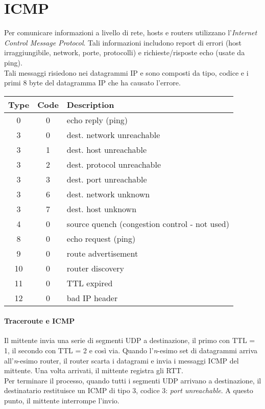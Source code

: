 \section{ICMP}
Per comunicare informazioni a livello di rete, hosts e routers utilizzano l'\textit{Internet Control Message Protocol}. Tali informazioni includono report di errori (host irraggiungibile, network, porte, protocolli) e richieste/risposte echo (usate da ping).\\
Tali messaggi risiedono nei datagrammi IP e sono composti da tipo, codice e i primi 8 byte del datagramma IP che ha causato l'errore.
\begin{center}
	\begin{tabular}{|c|c|p{5cm}|}
		\hline
		Type & Code & Description\\
		\hline
		0 & 0 & echo reply (ping)\\
		\hline
		3 & 0 & dest. network unreachable\\
		\hline
		3 & 1 & dest. host unreachable\\
		\hline
		3 & 2 & dest. protocol unreachable\\ 
		\hline
		3 & 3 & dest. port unreachable\\
		\hline
		3 & 6 & dest. network unknown\\
		\hline
		3 & 7 & dest. host unknown\\
		\hline
		4 & 0 & source quench (congestion control - not used)\\
		\hline
		8 & 0 & echo request (ping)\\
		\hline
		9 & 0 & route advertisement\\
		\hline
		10& 0 & router discovery\\
		\hline
		11& 0 & TTL expired\\
		\hline
		12& 0 & bad IP header\\
		\hline
	\end{tabular}
\end{center}

\paragraph{Traceroute e ICMP}
Il mittente invia una serie di segmenti UDP a destinazione, il primo con TTL = 1, il secondo con TTL = 2 e così via.
Quando l'\textit{n}-esimo set di datagrammi arriva all'\textit{n}-esimo router, il router scarta i datagrami e invia i messaggi ICMP del mittente. Una volta arrivati, il mittente registra gli RTT.\\
Per terminare il processo, quando tutti i segmenti UDP arrivano a destinazione, il destinatario restituisce un ICMP di tipo 3, codice 3: \textit{port unreachable}. A questo punto, il mittente interrompe l'invio.

